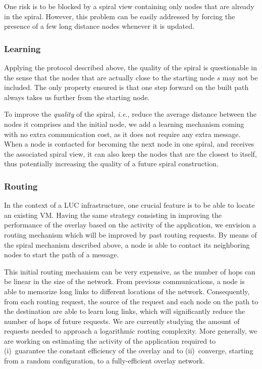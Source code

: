 One risk is to be blocked by a spiral view containing only
nodes that are already in the spiral. However, this problem can be easily
addressed by forcing the presence of a few long distance nodes whenever it is
updated.

\subsubsection*{Learning}

Applying the protocol described above, the quality of the spiral is
questionable in the sense that the nodes that are actually close to the starting
node $s$ may not be included. The only property ensured is that one step
forward on the built path always takes us further from the starting node.

To improve the \emph{quality} of the spiral, \emph{i.e.}, reduce the average
distance between the nodes it comprises and the initial node, we add a learning
mechanism coming with no extra communication cost, as it does not require any
extra message. When a node is contacted for becoming the next node in one
spiral, and receives the associated spiral view, it can also keep the nodes that
are the closest to itself, thus potentially increasing the quality of a future
spiral construction.

\subsubsection*{Routing}

In the context of a LUC infrastructure, one crucial feature is to be able to
locate an existing VM. Having the same strategy consisting in improving the
performance of the overlay based on the activity of the application, we envision a
routing mechanism which will be improved by past routing requests. By means of the
spiral mechanism described above, a node is able to contact its neighboring
nodes to start the path of a message.

This initial routing mechanism can be very expensive, as the number of hops can
be linear in the size of the network. From previous communications, a node is able
to memorize long links to different locations of the network. Consequently, from
each routing request, the source of the request and each node on the path to the
destination are able to learn long links, which will significantly reduce the
number of hops of future requests. We are currently studying the amount of requests
needed to approach a logarithmic routing complexity. More generally, we are working on
estimating the activity of the application required to (i)~guarantee the
constant efficiency of the overlay and to (ii)~converge, starting from a random
configuration, to a fully-efficient overlay network.

